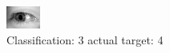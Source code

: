 \begin{figure}[h!]
\begin{center}
\includegraphics[width=0.60\columnwidth]{figures/ID3241_class_3_target_4.png}
\end{center}
\caption{ Classification: 3 actual target: 4}
\label{fig:ID3241_class_3_target_4}
\end{figure}
